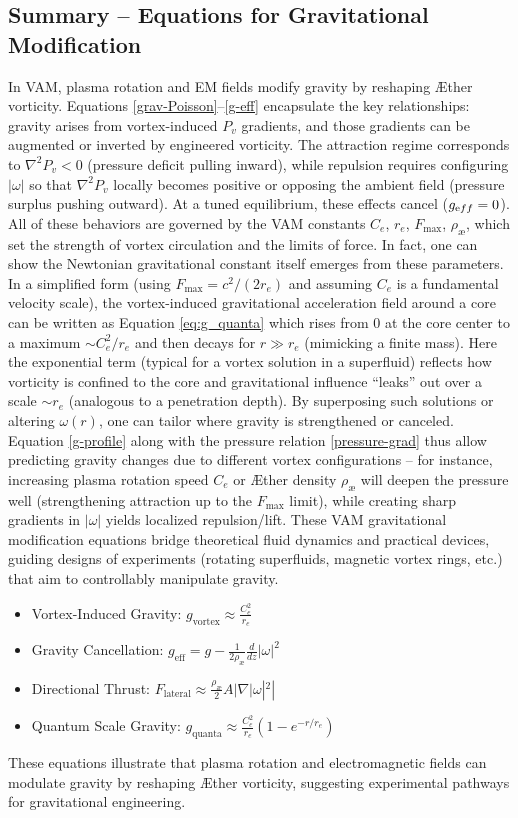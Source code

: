 \subsection*{Summary – Equations for Gravitational Modification}
In VAM, plasma rotation and EM fields modify gravity by reshaping Æther vorticity. Equations \eqref{grav-Poisson}–\eqref{g-eff} encapsulate the key relationships: gravity arises from vortex-induced $P_v$ gradients, and those gradients can be augmented or inverted by engineered vorticity. The attraction regime corresponds to $\nabla^2 P_v < 0$ (pressure deficit pulling inward), while repulsion requires configuring $|\omega|$ so that $\nabla^2 P_v$ locally becomes positive or opposing the ambient field (pressure surplus pushing outward). At a tuned equilibrium, these effects cancel ($g_{\textrm eff}=0$). All of these behaviors are governed by the VAM constants $C_e$, $r_e$, $F_{\max}$, $\rho_{\text{\ae}}$, which set the strength of vortex circulation and the limits of force. In fact, one can show the Newtonian gravitational constant itself emerges from these parameters. In a simplified form (using $F_{\max}=c^2/(2r_e)$ and assuming $C_e$ is a fundamental velocity scale), the vortex-induced gravitational acceleration field around a core can be written as Equation \eqref{eq:g_quanta} which rises from 0 at the core center to a maximum $\sim C_e^2/r_e$ and then decays for $r \gg r_e$ (mimicking a finite mass). Here the exponential term (typical for a vortex solution in a superfluid) reflects how vorticity is confined to the core and gravitational influence “leaks” out over a scale $\sim r_e$ (analogous to a penetration depth). By superposing such solutions or altering $\omega(r)$, one can tailor where gravity is strengthened or canceled. Equation \eqref{g-profile} along with the pressure relation \eqref{pressure-grad} thus allow predicting gravity changes due to different vortex configurations – for instance, increasing plasma rotation speed $C_e$ or Æther density $\rho_{\text{\ae}}$ will deepen the pressure well (strengthening attraction up to the $F_{\max}$ limit), while creating sharp gradients in $|\omega|$ yields localized repulsion/lift. These VAM gravitational modification equations bridge theoretical fluid dynamics and practical devices, guiding designs of experiments (rotating superfluids, magnetic vortex rings, etc.) that aim to controllably manipulate gravity.


\begin{itemize}
    \item Vortex-Induced Gravity: $g_{\text{vortex}} \approx \frac{C_e^2}{r_e}$
    \item Gravity Cancellation: $g_{\text{eff}} = g - \frac{1}{2 \rho_{\text{\ae}}} \frac{d}{dz} |\omega|^2$
    \item Directional Thrust: $F_{\text{lateral}} \approx \frac{\rho_{\text{\ae}}}{2} A |\nabla |\omega|^2|$
    \item Quantum Scale Gravity: $g_{\text{quanta}} \approx \frac{C_e^2}{r_e} (1 - e^{-r/r_e})$
\end{itemize}

These equations illustrate that plasma rotation and electromagnetic fields can modulate gravity by reshaping Æther vorticity, suggesting experimental pathways for gravitational engineering.